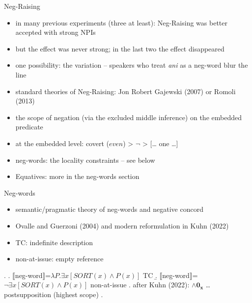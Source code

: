 \documentclass[
  ignorenonframetext,
]{beamer}
\providecommand{\tightlist}{%
  \setlength{\itemsep}{0pt}\setlength{\parskip}{0pt}}\usepackage{longtable,booktabs,array}
\begin{document}
\begin{frame}
\begin{block}{Neg-Raising}
\protect\hypertarget{neg-raising}{}
\begin{itemize}
\tightlist
\item
  in many previous experiments (three at least): Neg-Raising was better
  accepted with strong NPIs
\item
  but the effect was never strong; in the last two the effect
  disappeared
\item
  one possibility: the variation -- speakers who treat \emph{ani} as a
  neg-word blur the line
\item
  standard theories of Neg-Raising: Jon Robert Gajewski (2007) or Romoli
  (2013)
\item
  the scope of negation (via the excluded middle inference) on the
  embedded predicate
\item
  at the embedded level: covert (\(even\)) \textgreater{} \(\neg\)
  \textgreater{} {[}\ldots{} one \ldots{]}
\item
  neg-words: the locality constraints -- see below
\item
  Equatives: more in the neg-words section
\end{itemize}
\end{block}
\end{frame}

\begin{frame}
\begin{block}{Neg-words}
\protect\hypertarget{neg-words-1}{}
\begin{itemize}
\tightlist
\item
  semantic/pragmatic theory of neg-words and negative concord
\item
  Ovalle and Guerzoni (2004) and modern reformulation in Kuhn (2022)
\item
  TC: indefinite description
\item
  non-at-issue: empty reference
\end{itemize}

\ex. \a.
\(\llbracket\)neg-word\(\rrbracket\)=\(\lambda P.\exists x[SORT(x) \wedge P(x)]\)
\hfill TC \b.
\(\llbracket\)neg-word\(\rrbracket\)=\(\neg \exists x[SORT(x) \wedge P(x)]\)
\hfill non-at-issue \a. after Kuhn (2022): \(\wedge \mathbf{0_x}\)
\ldots postsupposition (highest scope) \z.

~
\end{block}
\end{frame}
\end{document}
